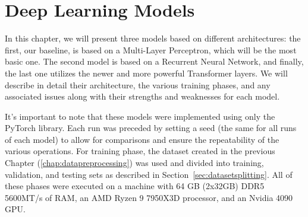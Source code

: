 \chapter{Deep Learning Models}
In this chapter, we will present three models based on
different architectures: the first, our baseline, is based on a
Multi-Layer Perceptron, which will be the most basic one.
The second model is based on a Recurrent Neural Network, and finally,
the last one utilizes the newer and more powerful Transformer layers.
We will describe in detail their architecture, the various training phases,
and any associated issues along with their strengths and weaknesses
for each model.

It's important to note that these models were implemented using only
the PyTorch library.
Each run was preceded by setting a seed (the same for all runs of each model)
to allow for comparisons and ensure the repeatability of the
various operations. For training phase, the dataset created in the
previous Chapter (\ref{chap:datapreprocessing}) was used and divided
into training, validation, and testing sets as described in Section~\ref{sec:datasetsplitting}.
All of these phases were executed on a machine with 64 GB (2x32GB) DDR5 5600MT/s of RAM,
an AMD Ryzen 9 7950X3D processor, and an Nvidia 4090 GPU.

%
%


%